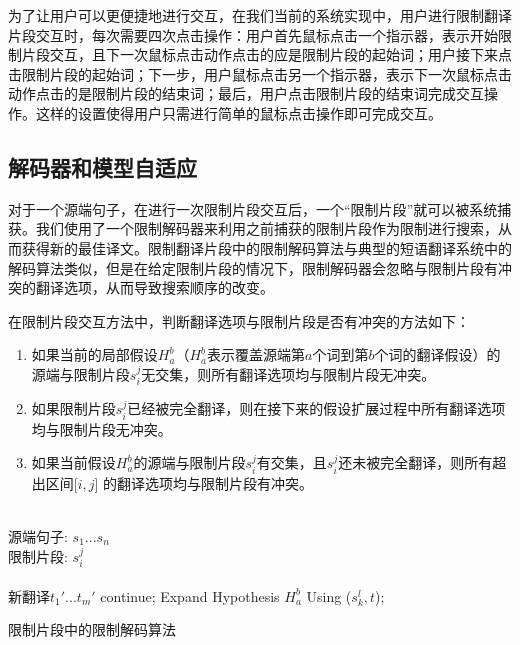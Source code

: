 \documentclass[master, winfont]{njuthesis}
\begin{document}
为了让用户可以更便捷地进行交互，在我们当前的系统实现中，用户进行限制翻译片段交互时，每次需要四次点击操作：用户首先鼠标点击一个指示器，表示开始限制片段交互，且下一次鼠标点击动作点击的应是限制片段的起始词；用户接下来点击限制片段的起始词；下一步，用户鼠标点击另一个指示器，表示下一次鼠标点击动作点击的是限制片段的结束词；最后，用户点击限制片段的结束词完成交互操作。这样的设置使得用户只需进行简单的鼠标点击操作即可完成交互。

\subsection{解码器和模型自适应}
对于一个源端句子，在进行一次限制片段交互后，一个“限制片段”就可以被系统捕获。我们使用了一个限制解码器来利用之前捕获的限制片段作为限制进行搜索，从而获得新的最佳译文。限制翻译片段中的限制解码算法与典型的短语翻译系统中的解码算法类似，但是在给定限制片段的情况下，限制解码器会忽略与限制片段有冲突的翻译选项，从而导致搜索顺序的改变。

在限制片段交互方法中，判断翻译选项与限制片段是否有冲突的方法如下：
\begin{enumerate}
  \item 如果当前的局部假设$H_a^b$（$H_a^b$表示覆盖源端第$a$个词到第$b$个词的翻译假设）的源端与限制片段$s_i^j$无交集，则所有翻译选项均与限制片段无冲突。
  \item 如果限制片段$s_i^j$已经被完全翻译，则在接下来的假设扩展过程中所有翻译选项均与限制片段无冲突。
  \item 如果当前假设$H_a^b$的源端与限制片段$s_i^j$有交集，且$s_i^j$还未被完全翻译，则所有超出区间[$i, j$] 的翻译选项均与限制片段有冲突。
\end{enumerate}

\begin{algorithm}
\begin{algorithmic}[1]
\REQUIRE ~~ \\
源端句子: $s_1 ... s_n$\\
限制片段: $s_i^j$\\
\ENSURE ~~ \\
新翻译$t_1' ... t_m'$
        \STATE continue;
    \ENDIF
\STATE Expand Hypothesis $H_a^b$ Using ($s_k^l, t$);
\ENDWHILE
\end{algorithmic}
\caption{限制片段中的限制解码算法}
\label{algorithm:spanconstrain}
\end{algorithm}
\end{document}
